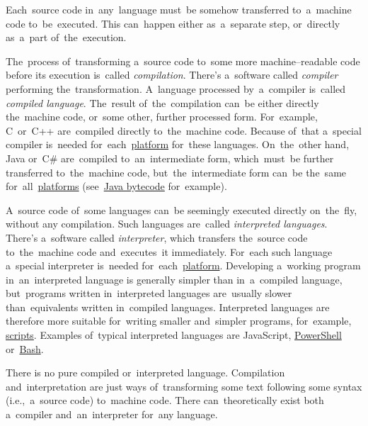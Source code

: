\label{compiledinterpretedlanguages}
Each~source code in~any~language must~be somehow transferred to~a~machine code to~be~executed.
This can~happen either as~a~separate step, or~directly as~a~part of~the~execution.

The~process of~transforming a~source code to~some more machine--readable code before its execution is~called \textit{compilation}.
There's a~software called \textit{compiler} performing the~transformation.
A~language processed by~a~compiler is~called \textit{compiled language}.
The~result of~the~compilation can~be either directly the~machine code, or~some other, further processed form.
For~example, \mbox{C~or~C++} are~compiled directly to~the~machine code.
Because of~that a~special compiler is~needed for~each~\hyperref[platform]{platform} for~these languages.
On~the~other hand, Java or~C\# are~compiled to~an~intermediate form, which~must~be further transferred to~the~machine code, but~the~intermediate form can~be the~same for~all~\hyperref[platform]{platforms} (see~\hyperref[javabytecode]{Java bytecode} for~example).

A~source code of~some languages can~be seemingly executed directly on~the~fly, without any compilation.
Such languages are~called \textit{interpreted languages}.
There's a~software called \textit{interpreter}, which transfers the~source code to~the~machine code and~executes~it immediately.
For~each such language a~special interpreter is~needed for~each~\hyperref[platform]{platform}.
Developing a~working program in~an~interpreted language is generally simpler than in~a~compiled language, but~programs written in~interpreted languages are~usually slower than~equivalents written in~compiled languages.
Interpreted languages are therefore more suitable for~writing smaller and~simpler programs, for~example, \hyperref[scriptinglanguages]{scripts}.
Examples of~typical interpreted languages are JavaScript, \hyperref[powershell]{PowerShell} or~\hyperref[shbash]{Bash}.

\warning There is no pure compiled or~interpreted language.
Compilation and~interpretation are just ways of~transforming some text following some syntax (i.e.,~a~source code) to~machine code.
There can~theoretically exist both a~compiler and~an~interpreter for~any language.
\newpage
